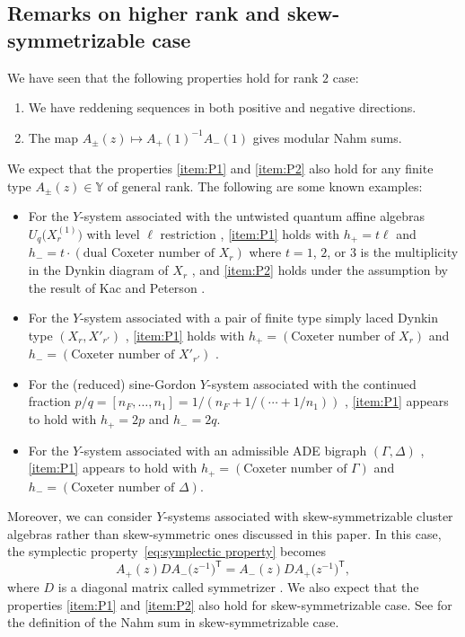 \documentclass[pdftex]{sigma}
\numberwithin{equation}{section}
\theoremstyle{definition}
\begin{document}
\subsection{Remarks on higher rank and skew-symmetrizable case}
\label{section:comments}
We have seen that the following properties hold for rank $2$ case:
\begin{enumerate}[label=(P\arabic*)]\itemsep=0pt
 \item \label{item:P1} We have reddening sequences in both positive and negative directions.
 \item \label{item:P2} The map $A_\pm(z) \mapsto A_+ (1)^{-1} A_- (1)$ gives modular Nahm sums.
\end{enumerate}
We expect that the properties \ref{item:P1} and \ref{item:P2} also hold for any finite
type $A_\pm (z) \in \mathbb{Y}$ of general rank. The following are some known examples:
\begin{itemize}\itemsep=0pt
 \item For the $Y$-system associated with the untwisted quantum affine algebras $U_q\bigl(X_r^{(1)}\bigr)$
 with level $\ell$ restriction \cite{KunibaNakanishi92},
 \ref{item:P1} holds with $h_+ = t \ell$ and $h_- = t \cdot (\text{dual Coxeter number of $X_r$})$
 where $t = 1$, $2$, or $3$ is the multiplicity in the Dynkin diagram of $X_r$ \cite{IIKKNa,IIKKNb}, and
 \ref{item:P2} holds under the assumption \cite[Conjecture 5.3]{HKOTT} by the
 result of Kac and Peterson \cite{KacPet}.
 \item For the $Y$-system associated with a pair of finite type simply laced Dynkin type $(X_r, X'_{r'})$ \cite{RVT},
 \ref{item:P1} holds with $h_+ = (\text{Coxeter number of $X_r$})$ and $h_- = (\text{Coxeter number of $X'_{r'}$})$ \cite{Keller2011, Keller}.
 \item For the (reduced) sine-Gordon $Y$-system associated with the continued fraction
 $p/q = [n_F, \dots, n_1] = 1/ (n_F + 1/ (\cdots + 1/ n_1))$ \cite{NakanishiStella, Tateo},
 \ref{item:P1} appears to hold with $h_+ = 2 p$ and $h_- = 2 q$.
 \item For the $Y$-system associated with an admissible ADE bigraph $(\Gamma, \Delta)$ \cite{GalashinPylyavskyy},
 \ref{item:P1} appears to hold with $h_+ = (\text{Coxeter number of $\Gamma$})$ and
 $h_- = (\text{Coxeter number of $\Delta$})$.
\end{itemize}

Moreover, we can consider $Y$-systems associated with skew-symmetrizable cluster algebras rather than skew-symmetric ones
discussed in this paper. In this case, the symplectic property~\eqref{eq:symplectic property} becomes
\begin{equation*}
 A_+ (z) D A_-\bigl(z^{-1}\bigr)^{\mathsf{T}} = A_- (z) D A_+ \bigl(z^{-1}\bigr)^{\mathsf{T}},
\end{equation*}
where $D$ is a diagonal matrix called symmetrizer \cite{mizuno2020difference}.
We also expect that the properties \ref{item:P1} and \ref{item:P2} also hold for skew-symmetrizable case.
See \cite[Definition 5.12]{mizuno2020difference} for the definition of the Nahm sum in skew-symmetrizable case.
\end{document}
